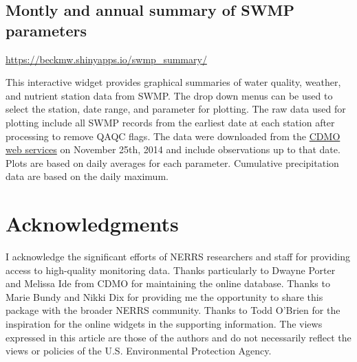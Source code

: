 \documentclass[10pt,letterpaper]{article}\usepackage[]{graphicx}\usepackage[]{color}
\begin{document}
\subsection*{Montly and annual summary of SWMP parameters}
\label{swmp_summary}
\href{https://beckmw.shinyapps.io/swmp_summary/}{https://beckmw.shinyapps.io/swmp\_summary/}

This interactive widget provides graphical summaries of water quality, weather, and nutrient station data from SWMP. The drop down menus can be used to select the station, date range, and parameter for plotting. The raw data used for plotting include all SWMP records from the earliest date at each station after processing to remove QAQC flags.  The data were downloaded from the \href{http://cdmo.baruch.sc.edu/}{CDMO web services} on November 25th, 2014 and include observations up to that date.  Plots are based on daily averages for each parameter.  Cumulative precipitation data are based on the daily maximum.

\section*{Acknowledgments}

I acknowledge the significant efforts of \ac{NERRS} researchers and staff for providing access to high-quality monitoring data.  Thanks particularly to Dwayne Porter and Melissa Ide from \ac{CDMO} for maintaining the online database.  Thanks to Marie Bundy and Nikki Dix for providing me the opportunity to share this package with the broader \ac{NERRS} community.  Thanks to Todd O'Brien for the inspiration for the online widgets in the supporting information. The views expressed in this article are those of the authors and do not necessarily reflect the views or policies of the U.S. Environmental Protection Agency.   

\nolinenumbers


\end{document}
